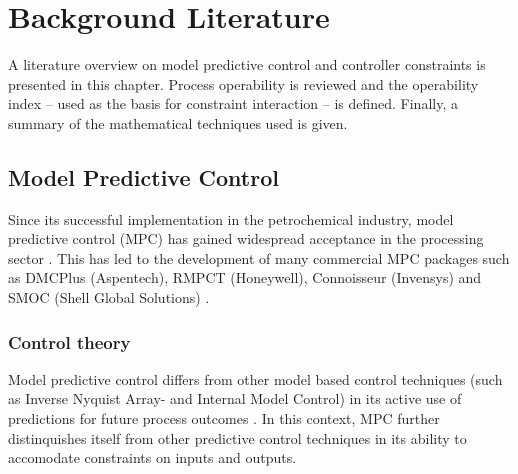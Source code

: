 \chapter{Background Literature}\label{chap:lit}
\begin{overview}
  A literature overview on model predictive control and controller constraints
  is presented in this chapter. Process operability is reviewed and the
  operability index -- used as the basis for constraint interaction -- is 
  defined. Finally, a summary of the mathematical techniques used is given.
\end{overview}

\section{Model Predictive Control}
Since its successful implementation in the petrochemical industry, model
predictive control (MPC) has gained widespread acceptance in the processing 
sector \citep[1]{maciejowskimpc}. This has led to the development of many 
commercial MPC packages such as DMCPlus (Aspentech), RMPCT (Honeywell),
Connoisseur (Invensys) and SMOC (Shell Global Solutions) \citep{qinbadgwell}.
\subsection{Control theory}
Model predictive control differs from other model based control techniques (such
 as Inverse Nyquist Array- and Internal Model Control) in its active use of 
predictions for future process outcomes \citep[137]{maciejowskifb}. In this 
context, MPC further distinquishes itself from other predictive control
techniques in its ability to accomodate constraints on inputs and outputs.

